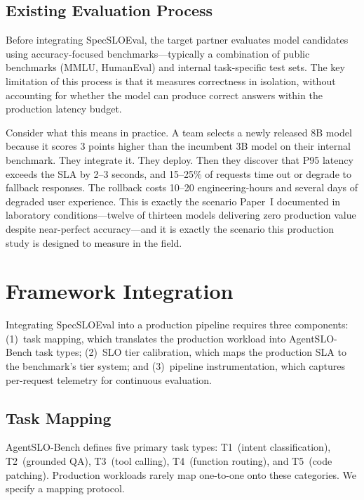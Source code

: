 \documentclass[11pt]{article}
\begin{document}
\subsection{Existing Evaluation Process}

Before integrating SpecSLOEval, the target partner evaluates model candidates using accuracy-focused benchmarks---typically a combination of public benchmarks (MMLU, HumanEval) and internal task-specific test sets. The key limitation of this process is that it measures correctness in isolation, without accounting for whether the model can produce correct answers within the production latency budget.

Consider what this means in practice. A team selects a newly released 8B model because it scores 3 points higher than the incumbent 3B model on their internal benchmark. They integrate it. They deploy. Then they discover that P95 latency exceeds the SLA by 2--3 seconds, and 15--25\% of requests time out or degrade to fallback responses. The rollback costs 10--20 engineering-hours and several days of degraded user experience. This is exactly the scenario Paper~I documented in laboratory conditions---twelve of thirteen models delivering zero production value despite near-perfect accuracy---and it is exactly the scenario this production study is designed to measure in the field.

\section{Framework Integration}
\label{sec:integration}

Integrating SpecSLOEval into a production pipeline requires three components: (1)~task mapping, which translates the production workload into AgentSLO-Bench task types; (2)~SLO tier calibration, which maps the production SLA to the benchmark's tier system; and (3)~pipeline instrumentation, which captures per-request telemetry for continuous evaluation.

\subsection{Task Mapping}

AgentSLO-Bench defines five primary task types: T1~(intent classification), T2~(grounded QA), T3~(tool calling), T4~(function routing), and T5~(code patching). Production workloads rarely map one-to-one onto these categories. We specify a mapping protocol.
\end{document}
